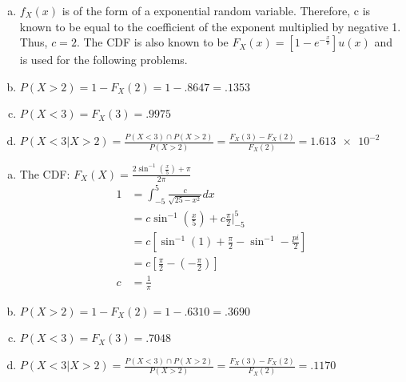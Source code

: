\documentclass[12pt]{article}
\newenvironment{problem}[2][Problem]{\begin{trivlist}
\item[\hskip \labelsep {\bfseries #1}\hskip \labelsep {\bfseries #2.}]
  \vspace{1 cm}
}{\end{trivlist}}
\begin{document}
\begin{problem}{3.13}
\item
  \begin{enumerate}[a.]
    \item %
      $f_X(x)$ is of the form of a exponential random variable. Therefore,
      c is known to be equal to the coefficient of the exponent multiplied
      by negative 1. Thus, $c = 2$. The CDF is also known to be 
      $F_X(x) = \left[1 - e^{-\frac{x}{b}}\right]u(x)$ and is used for the 
      following problems. 
    \item %
      $P(X>2) = 1 - F_X(2) = 1 - .8647 = .1353$
    \item %
      $P(X<3) = F_X(3) = .9975$
    \item %
      $P(X < 3|X>2) = \frac{P(X<3)\cap P(X>2)}{P(X>2)}
      = \frac{F_X(3) - F_X(2)}{F_X(2)} = \num{1.613e-2}$
  \end{enumerate}
\end{problem}

\begin{problem}{3.15}
\item
  \begin{enumerate}[a.]
    \item %
      The CDF: $F_X(X) = \frac{2\sin^{-1}(\frac{x}{5})+\pi}{2\pi}$
      \begin{align*}
        1 &= \int_{-5}^5 \frac{c}{\sqrt{25-x^2}}dx \\
        &= c\sin^{-1}\left( \frac{x}{5} \right) + c\frac{\pi}{2}\big|_{-5}^5 \\
        &= c\left[ \sin^{-1}(1) + \frac{\pi}{2} - \sin^{-1} - \frac{pi}{2} \right] \\
        &= c\left[ \frac{\pi}{2} - (-\frac{\pi}{2})\right] \\
        c &= \frac{1}{\pi}
      \end{align*}
    \item %
      $P(X>2) = 1 - F_X(2) = 1 - .6310 = .3690$
    \item %
      $P(X<3) = F_X(3) = .7048$
    \item %
      $P(X < 3|X>2) = \frac{P(X<3)\cap P(X>2)}{P(X>2)}
      = \frac{F_X(3) - F_X(2)}{F_X(2)} = .1170$
  \end{enumerate}
\end{problem}
\end{document}
